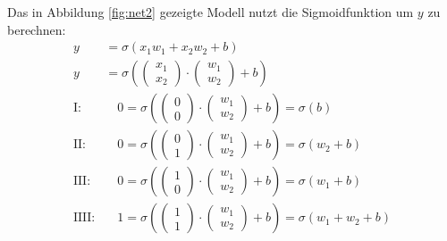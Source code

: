 \begin{flushleft}
Das in Abbildung \ref{fig:net2} gezeigte Modell nutzt die Sigmoidfunktion um $y$ zu berechnen:
\begin{align}
    y&=\sigma(x_1w_1+x_2w_2+b) \\
    y&=\sigma\left(\begin{pmatrix}
        x_1 \\
        x_2
    \end{pmatrix}\cdot
    \begin{pmatrix}
        w_1 \\
        w_2
    \end{pmatrix}+b\right) \\
    \text{I:}&\quad 0=\sigma\left(\begin{pmatrix}
        0 \\
        0
    \end{pmatrix}\cdot
    \begin{pmatrix}
        w_1 \\
        w_2
    \end{pmatrix}+b\right)=\sigma(b) \\
    \text{II:}&\quad 0=\sigma\left(\begin{pmatrix}
        0 \\
        1
    \end{pmatrix}\cdot
    \begin{pmatrix}
        w_1 \\
        w_2
    \end{pmatrix}+b\right)=\sigma(w_2+b) \\
    \text{III:}&\quad 0=\sigma\left(\begin{pmatrix}
        1 \\
        0
    \end{pmatrix}\cdot
    \begin{pmatrix}
        w_1 \\
        w_2
    \end{pmatrix}+b\right)=\sigma(w_1+b) \\
    \text{IIII:}&\quad 1=\sigma\left(\begin{pmatrix}
        1 \\
        1
    \end{pmatrix}\cdot
    \begin{pmatrix}
        w_1 \\
        w_2
    \end{pmatrix}+b\right)=\sigma(w_1+w_2+b)
\end{align}


\end{flushleft}
